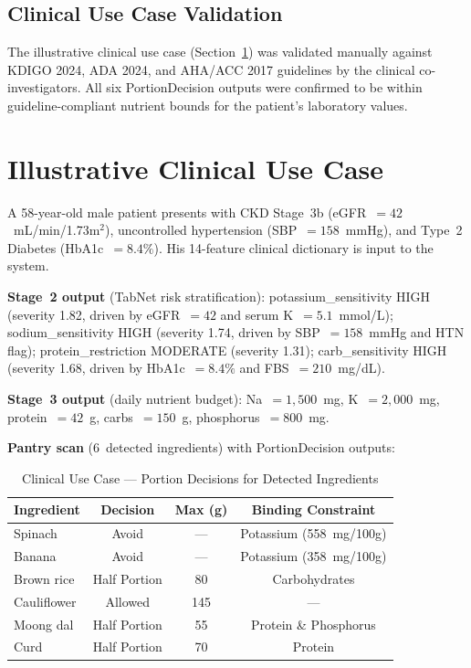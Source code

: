 \documentclass[journal]{IEEEtran}
\begin{document}
\subsection{Clinical Use Case Validation}

The illustrative clinical use case (Section~\ref{sec:usecase}) was
validated manually against KDIGO 2024, ADA 2024, and AHA/ACC 2017
guidelines by the clinical co-investigators. All six PortionDecision
outputs were confirmed to be within guideline-compliant nutrient bounds
for the patient's laboratory values.

\section{Illustrative Clinical Use Case}
\label{sec:usecase}

A 58-year-old male patient presents with CKD Stage~3b
(eGFR~$= 42$~mL/min/1.73m$^2$), uncontrolled hypertension
(SBP~$= 158$~mmHg), and Type~2 Diabetes (HbA1c~$= 8.4\%$). His 14-feature
clinical dictionary is input to the system.

\textbf{Stage~2 output} (TabNet risk stratification):
potassium\_sensitivity HIGH (severity 1.82, driven by eGFR~$=42$ and
serum K~$= 5.1$~mmol/L); sodium\_sensitivity HIGH (severity 1.74,
driven by SBP~$=158$~mmHg and HTN flag); protein\_restriction MODERATE
(severity 1.31); carb\_sensitivity HIGH (severity 1.68, driven by
HbA1c~$= 8.4\%$ and FBS~$= 210$~mg/dL).

\textbf{Stage~3 output} (daily nutrient budget):
Na~$= 1{,}500$~mg, K~$= 2{,}000$~mg, protein~$= 42$~g, carbs~$= 150$~g,
phosphorus~$= 800$~mg.

\textbf{Pantry scan} (6~detected ingredients) with PortionDecision outputs:

\begin{table}[!h]
\caption{Clinical Use Case --- Portion Decisions for Detected Ingredients}
\label{tab:usecase}
\centering
\renewcommand{\arraystretch}{1.2}
\begin{tabular}{lccc}
\toprule
\textbf{Ingredient} & \textbf{Decision} & \textbf{Max (g)} & \textbf{Binding Constraint} \\
\midrule
Spinach       & Avoid       & ---   & Potassium (558~mg/100g) \\
Banana        & Avoid       & ---   & Potassium (358~mg/100g) \\
Brown rice    & Half Portion & 80   & Carbohydrates \\
Cauliflower   & Allowed     & 145   & --- \\
Moong dal     & Half Portion & 55   & Protein \& Phosphorus \\
Curd          & Half Portion & 70   & Protein \\
\bottomrule
\end{tabular}
\end{table}
\end{document}
